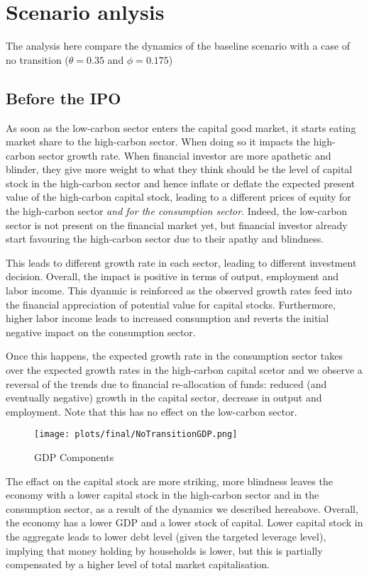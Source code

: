 \documentclass[]{article}
\begin{document}
\section{Scenario anlysis}\label{scenario-anlysis}

The analysis here compare the dynamics of the baseline scenario with a
case of no transition (\(\theta=0.35\) and \(\phi=0.175\))

\subsection{Before the IPO}\label{before-the-ipo}

As soon as the low-carbon sector enters the capital good market, it
starts eating market share to the high-carbon sector. When doing so it
impacts the high-carbon sector growth rate. When financial investor are
more apathetic and blinder, they give more weight to what they think
should be the level of capital stock in the high-carbon sector and hence
inflate or deflate the expected present value of the high-carbon capital
stock, leading to a different prices of equity for the high-carbon
sector \emph{and for the consumption sector}. Indeed, the low-carbon
sector is not present on the financial market yet, but financial
investor already start favouring the high-carbon sector due to their
apathy and blindness.

This leads to different growth rate in each sector, leading to different
investment decision. Overall, the impact is positive in terms of output,
employment and labor income. This dyanmic is reinforced as the observed
growth rates feed into the financial appreciation of potential value for
capital stocks. Furthermore, higher labor income leads to increased
consumption and reverts the initial negative impact on the consumption
sector.

Once this happens, the expected growth rate in the consumption sector
takes over the expected growth rates in the high-carbon capital scetor
and we observe a reversal of the trends due to financial re-allocation
of funds: reduced (and eventually negative) growth in the capital
sector, decrease in output and employment. Note that this has no effect
on the low-carbon sector.

\begin{figure}[htbp]
\centering
\texttt{[image: plots/final/NoTransitionGDP.png]}
\caption{GDP Components}
\end{figure}

The effact on the capital stock are more striking, more blindness leaves
the economy with a lower capital stock in the high-carbon sector and in
the consumption sector, as a result of the dynamics we described
hereabove. Overall, the economy has a lower GDP and a lower stock of
capital. Lower capital stock in the aggregate leads to lower debt level
(given the targeted leverage level), implying that money holding by
households is lower, but this is partially compensated by a higher level
of total market capitalisation.
\end{document}
